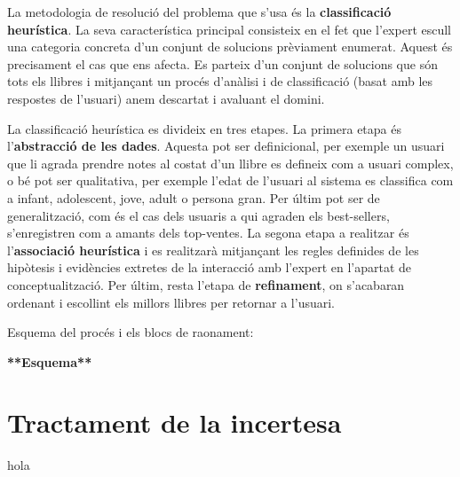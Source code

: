La metodologia de resolució del problema que s'usa és la \textbf{classificació heurística}. La seva característica principal consisteix en el fet que l'expert escull una categoria concreta d'un conjunt de solucions prèviament enumerat. Aquest és precisament el cas que ens afecta. Es parteix d'un conjunt de solucions que són tots els llibres i mitjançant un procés d'anàlisi i de classificació (basat amb les respostes de l'usuari) anem descartat i avaluant el domini.

La classificació heurística es divideix en tres etapes. La primera etapa és l'\textbf{abstracció de les dades}. Aquesta pot ser definicional, per exemple un usuari que li agrada prendre notes al costat d'un llibre es defineix com a usuari complex, o bé pot ser qualitativa, per exemple l'edat de l'usuari al sistema es classifica com a infant, adolescent, jove, adult o persona gran. Per últim pot ser de generalització, com és el cas dels usuaris a qui agraden els best-sellers, s'enregistren com a amants dels top-ventes. La segona etapa a realitzar és l'\textbf{associació heurística} i es realitzarà mitjançant les regles definides de les hipòtesis i evidències extretes de la interacció amb l'expert en l'apartat de conceptualització. Per últim, resta l'etapa de \textbf{refinament}, on s'acabaran ordenant i escollint els millors llibres per retornar a l'usuari.

Esquema del procés i els blocs de raonament:

\textbf{**Esquema**}

\section{Tractament de la incertesa}

hola


